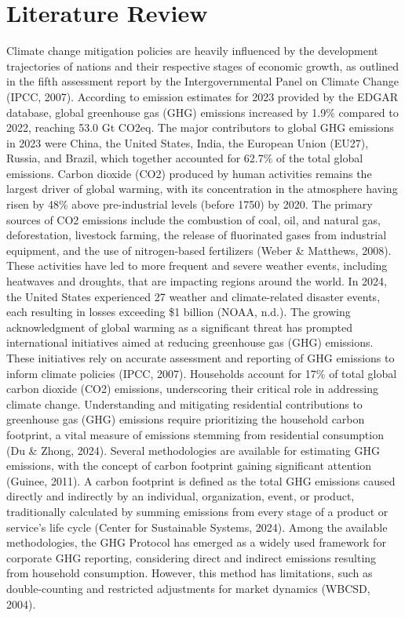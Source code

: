 \documentclass[12pt,a4paper]{article}%
\begin{document}
\section{Literature Review}
Climate change mitigation policies are heavily influenced by the development trajectories of nations and their respective stages of economic growth, as outlined in the fifth assessment report by the Intergovernmental Panel on Climate Change (IPCC, 2007). According to emission estimates for 2023 provided by the EDGAR database, global greenhouse gas (GHG) emissions increased by 1.9\% compared to 2022, reaching 53.0 Gt CO2eq. The major contributors to global GHG emissions in 2023 were China, the United States, India, the European Union (EU27), Russia, and Brazil, which together accounted for 62.7\% of the total global emissions. Carbon dioxide (CO2) produced by human activities remains the largest driver of global warming, with its concentration in the atmosphere having risen by 48\% above pre-industrial levels (before 1750) by 2020. The primary sources of CO2 emissions include the combustion of coal, oil, and natural gas, deforestation, livestock farming, the release of fluorinated gases from industrial equipment, and the use of nitrogen-based fertilizers (Weber \& Matthews, 2008). These activities have led to more frequent and severe weather events, including heatwaves and droughts, that are impacting regions around the world. In 2024, the United States experienced 27 weather and climate-related disaster events, each resulting in losses exceeding \$1 billion (NOAA, n.d.).
\vspace{5pt}
The growing acknowledgment of global warming as a significant threat has prompted international initiatives aimed at reducing greenhouse gas (GHG) emissions. These initiatives rely on accurate assessment and reporting of GHG emissions to inform climate policies (IPCC, 2007). Households account for 17\% of total global carbon dioxide (CO2) emissions, underscoring their critical role in addressing climate change. Understanding and mitigating residential contributions to greenhouse gas (GHG) emissions require prioritizing the household carbon footprint, a vital measure of emissions stemming from residential consumption (Du \& Zhong, 2024). Several methodologies are available for estimating GHG emissions, with the concept of carbon footprint gaining significant attention (Guinee, 2011). A carbon footprint is defined as the total GHG emissions caused directly and indirectly by an individual, organization, event, or product, traditionally calculated by summing emissions from every stage of a product or service's life cycle (Center for Sustainable Systems, 2024). Among the available methodologies, the GHG Protocol has emerged as a widely used framework for corporate GHG reporting, considering direct and indirect emissions resulting from household consumption. However, this method has limitations, such as double-counting and restricted adjustments for market dynamics (WBCSD, 2004). 
\vspace{5pt}
\end{document}
